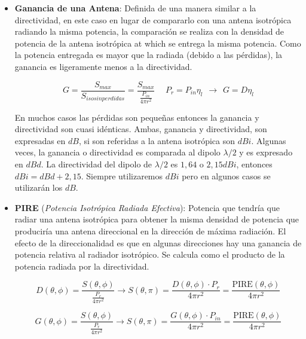 \documentclass[10pt,portrait, twocolumn]{article}
\begin{document}
\begin{itemize}
		\item \textbf{Ganancia de una Antena}: Definida de una manera similar a la directividad, en este caso en lugar de compararlo con una antena isotrópica radiando la misma potencia, la comparación se realiza con la densidad de potencia de la antena isotrópica at which se entrega la misma potencia. Como la potencia entregada es mayor que la radiada (debido a las pérdidas), la ganancia es ligeramente menos a la directividad.
		
		\begin{equation*}
		G = \frac{S_{max}}{S_{iso sin perdidas}} = \frac{S_{max}}{\frac{P_{in}}{4 \pi r^{2}}} \hspace{15pt} P_{r} = P_{in} \eta_{l} \hspace{5pt} \rightarrow \hspace{5pt} G = D \eta_{l}
		\end{equation*}
		
		En muchos casos las pérdidas son pequeñas entonces la ganancia y directividad son cuasi idénticas. Ambas, ganancia y directividad, son expresadas en $dB$, si son referidas a la antena isotrópica son $dBi$. Algunas veces, la ganancia o directividad es comparada al dipolo $\lambda / 2$ y es expresado en $dBd$. La directividad del dipolo de $\lambda / 2$ es $1,64$ o $2,15 dBi$, entonces $dBi = dBd + 2,15$. Siempre utilizaremos $dBi$ pero en algunos casos se utilizarán los $dB$.
		
		\item \textbf{PIRE} (\textit{Potencia Isotrópica Radiada Efectiva}): Potencia que tendría que radiar una antena isotrópica para obtener la misma densidad de potencia que produciría una antena direccional en la dirección de máxima radiación. El efecto de la direccionalidad es que en algunas direcciones hay una ganancia de potencia relativa al radiador isotrópico. Se calcula como el producto de la potencia radiada por la directividad.
		
		\begin{equation*}
		D(\theta, \phi) = \frac{S(\theta, \phi)}{\frac{P_{r}}{4 \pi r^{2}}} \rightarrow S(\theta, \pi) = \frac{D(\theta, \phi) \cdot P_{r}}{4 \pi r^{2}} = \frac{\text{PIRE}(\theta, \phi)}{4 \pi r^2} 
		\end{equation*}
		
		\begin{equation*}
		G(\theta, \phi) = \frac{S(\theta, \phi)}{\frac{P_{r}}{4 \pi r^{2}}} \rightarrow S(\theta, \pi) = \frac{G(\theta, \phi) \cdot P_{in}}{4 \pi r^{2}} = \frac{\text{PIRE}(\theta, \phi)}{4 \pi r^2} 
		\end{equation*}
		

\end{itemize}
\end{document}
